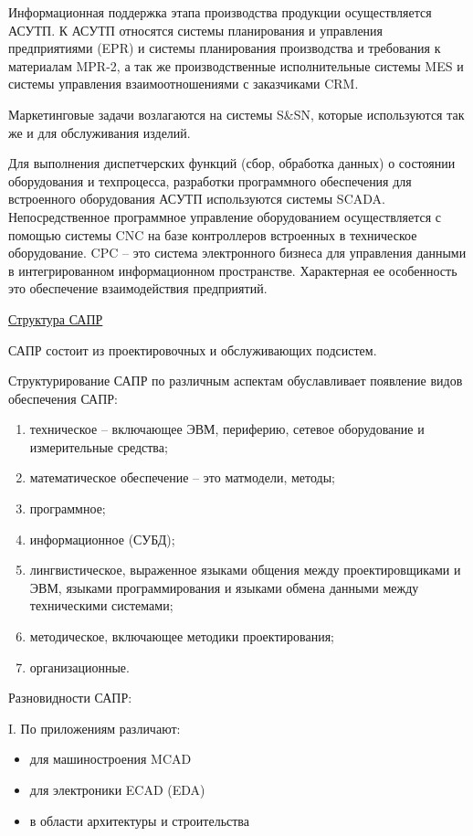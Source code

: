 \documentclass[unicode, 12pt, a4paper, oneside]{article}
\begin{document}
Информационная поддержка этапа производства продукции осуществляется АСУТП. К АСУТП относятся системы планирования и управления предприятиями (EPR) и системы планирования производства и требования к материалам MPR-2, а так же производственные исполнительные системы MES  и системы управления взаимоотношениями с заказчиками CRM.

Маркетинговые задачи возлагаются на системы S\&SN, которые используются так же и для обслуживания изделий.

Для выполнения диспетчерских функций (сбор, обработка данных) о состоянии оборудования и техпроцесса, разработки программного обеспечения для встроенного оборудования АСУТП используются системы SCADA. Непосредственное программное управление оборудованием осуществляется с помощью системы CNC на базе контроллеров встроенных в техническое оборудование. CPC – это система электронного бизнеса для управления данными в интегрированном информационном пространстве. Характерная ее особенность это обеспечение взаимодействия предприятий.

\underline{Структура САПР}

САПР состоит из проектировочных и обслуживающих подсистем.

Структурирование САПР по различным аспектам обуславливает появление видов обеспечения САПР:
\begin{enumerate}
\item техническое – включающее ЭВМ, периферию, сетевое оборудование и измерительные средства;
\item математическое обеспечение – это матмодели, методы;
\item программное;
\item информационное (СУБД);
\item лингвистическое, выраженное языками общения между проектировщиками и ЭВМ, языками программирования и языками обмена данными между техническими системами;
\item методическое, включающее методики проектирования;
\item организационные.
\end{enumerate}

Разновидности САПР:

I. По приложениям различают:
\begin{itemize}
\item для машиностроения MCAD
\item для электроники ECAD (EDA)
\item в области архитектуры и строительства
\end{itemize}
\end{document}
